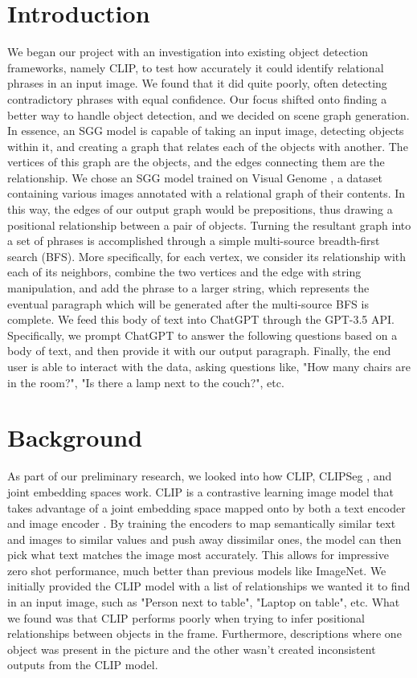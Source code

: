 \documentclass[letterpaper, 10 pt, conference]{ieeeconf}  %
\begin{document}
\section{Introduction}
    We began our project with an investigation into existing object detection frameworks, namely CLIP, to test how accurately it could identify relational phrases in an input image. We found that it did quite poorly, often detecting contradictory phrases with equal confidence. Our focus shifted onto finding a better way to handle object detection, and we decided on scene graph generation. In essence, an SGG model is capable of taking an input image, detecting objects within it, and creating a graph that relates each of the objects with another. The vertices of this graph are the objects, and the edges connecting them are the relationship. We chose an SGG model trained on Visual Genome \cite{Krishna_Zhu_Groth_Johnson_Hata_Kravitz_Chen_Kalantidis_Li_Shamma_et_al._2017}, a dataset containing various images annotated with a relational graph of their contents. In this way, the edges of our output graph would be prepositions, thus drawing a positional relationship between a pair of objects. Turning the resultant graph into a set of phrases is accomplished through a simple multi-source breadth-first search (BFS). More specifically, for each vertex, we consider its relationship with each of its neighbors, combine the two vertices and the edge with string manipulation, and add the phrase to a larger string, which represents the eventual paragraph which will be generated after the multi-source BFS is complete. We feed this body of text into ChatGPT through the GPT-3.5 API. Specifically, we prompt ChatGPT to answer the following questions based on a body of text, and then provide it with our output paragraph. Finally, the end user is able to interact with the data, asking questions like, "How many chairs are in the room?", "Is there a lamp next to the couch?", etc.

\section{Background}
    As part of our preliminary research, we looked into how CLIP, CLIPSeg \cite{lueddecke22_cvpr}, and joint embedding spaces work. CLIP is a contrastive learning image model that takes advantage of a joint embedding space mapped onto by both a text encoder and image encoder \cite{radford2021learning}. By training the encoders to map semantically similar text and images to similar values and push away dissimilar ones, the model can then pick what text matches the image most accurately. This allows for impressive zero shot performance, much better than previous models like ImageNet. We initially provided the CLIP model with a list of relationships we wanted it to find in an input image, such as "Person next to table", "Laptop on table", etc. What we found was that CLIP performs poorly when trying to infer positional relationships between objects in the frame. Furthermore, descriptions where one object was present in the picture and the other wasn't created inconsistent outputs from the CLIP model.
\end{document}
